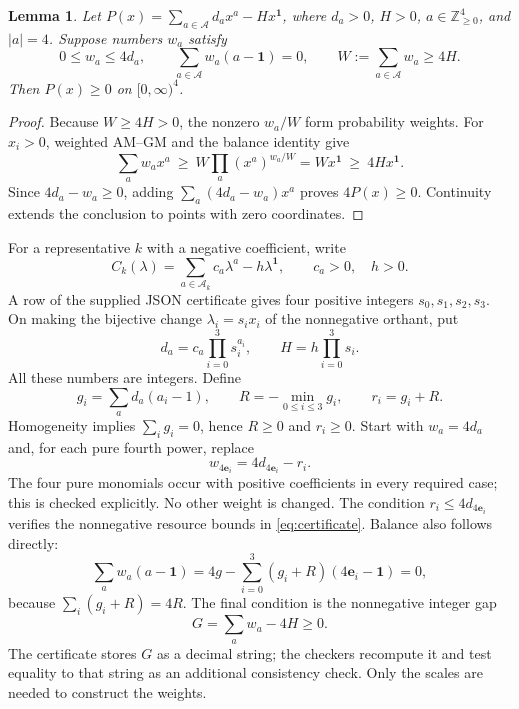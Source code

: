 \documentclass[11pt,letterpaper]{article}
\newtheorem{lemma}[theorem]{Lemma}
\newcommand{\one}{\boldsymbol{1}}
\begin{document}
\begin{lemma}\label{lem:amgm}
Let $P(x)=\sum_{a\in\mathcal A}d_a x^a-Hx^{\one}$, where $d_a>0$, $H>0$, $a\in\mathbb Z_{\ge0}^4$, and $|a|=4$. Suppose numbers $w_a$ satisfy
\begin{equation}\label{eq:certificate}
0\le w_a\le4d_a,\qquad
\sum_{a\in\mathcal A}w_a(a-\one)=0,\qquad
W:=\sum_{a\in\mathcal A}w_a\ge4H.
\end{equation}
Then $P(x)\ge0$ on $[0,\infty)^4$.
\end{lemma}
\begin{proof}
Because $W\ge4H>0$, the nonzero $w_a/W$ form probability weights. For $x_i>0$, weighted AM--GM and the balance identity give
\[
\sum_a w_a x^a\ \ge\ W\prod_a(x^a)^{w_a/W}
 = W x^{\one}\ \ge\ 4H x^{\one}.
\]
Since $4d_a-w_a\ge0$, adding $\sum_a(4d_a-w_a)x^a$ proves $4P(x)\ge0$. Continuity extends the conclusion to points with zero coordinates.
\end{proof}

For a representative $k$ with a negative coefficient, write
\[
C_k(\lambda)=\sum_{a\in\mathcal A_k}c_a\lambda^a-h\lambda^{\one},
\qquad c_a>0,\quad h>0.
\]
A row of the supplied JSON certificate gives four positive integers $s_0,s_1,s_2,s_3$. On making the bijective change $\lambda_i=s_ix_i$ of the nonnegative orthant, put
\begin{equation}\label{eq:scales}
d_a=c_a\prod_{i=0}^3s_i^{a_i},\qquad H=h\prod_{i=0}^3s_i.
\end{equation}
All these numbers are integers. Define
\begin{equation}\label{eq:gradient}
g_i=\sum_a d_a(a_i-1),\qquad R=-\min_{0\le i\le3}g_i,\qquad r_i=g_i+R.
\end{equation}
Homogeneity implies $\sum_i g_i=0$, hence $R\ge0$ and $r_i\ge0$. Start with $w_a=4d_a$ and, for each pure fourth power, replace
\begin{equation}\label{eq:weights}
w_{4\mathbf e_i}=4d_{4\mathbf e_i}-r_i.
\end{equation}
The four pure monomials occur with positive coefficients in every required case; this is checked explicitly. No other weight is changed. The condition $r_i\le4d_{4\mathbf e_i}$ verifies the nonnegative resource bounds in \eqref{eq:certificate}. Balance also follows directly:
\[
\sum_a w_a(a-\one)
=4g-\sum_{i=0}^3(g_i+R)(4\mathbf e_i-\one)=0,
\]
because $\sum_i(g_i+R)=4R$. The final condition is the nonnegative integer gap
\begin{equation}\label{eq:gap}
G=\sum_a w_a-4H\ge0.
\end{equation}
The certificate stores $G$ as a decimal string; the checkers recompute it and test equality to that string as an additional consistency check. Only the scales are needed to construct the weights.
\end{document}
